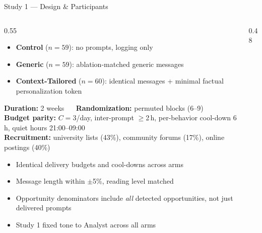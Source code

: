 \documentclass[10pt,aspectratio=169]{beamer}
\begin{document}
\begin{frame}{Study 1 --- Design \& Participants}
\vspace{-2pt}
\begin{columns}[T]
\begin{column}{0.55\textwidth}
\vspace{0pt}
\begin{keybox}
\scriptsize
\begin{itemize}
  \item \textbf{Control} ($n{=}59$): no prompts, logging only
  \item \textbf{Generic} ($n{=}59$): ablation-matched generic messages
  \item \textbf{Context-Tailored} ($n{=}60$): identical messages + minimal factual personalization token
\end{itemize}
\vspace{1pt}
\tiny
\textbf{Duration:} 2 weeks ~\textbullet~ \textbf{Randomization:} permuted blocks (6--9)\\
\textbf{Budget parity:} $C{=}3$/day, inter-prompt $\ge$2\,h, per-behavior cool-down 6\,h, quiet hours 21:00--09:00\\
\textbf{Recruitment:} university lists (43\%), community forums (17\%), online postings (40\%)
\end{keybox}
\vspace{0pt}
\begin{alertbox}
\scriptsize
\begin{itemize}
  \item Identical delivery budgets and cool-downs across arms
  \item Message length within $\pm$5\%, reading level matched
  \item Opportunity denominators include \emph{all} detected opportunities, not just delivered prompts
  \item Study 1 fixed tone to Analyst across all arms
\end{itemize}
\end{alertbox}
\end{column}
\begin{column}{0.48\textwidth}
{\scriptsize
\begin{table}
\centering
\renewcommand{\arraystretch}{0.95}
\end{table}}
\end{column}
\end{columns}
\end{frame}
\end{document}
